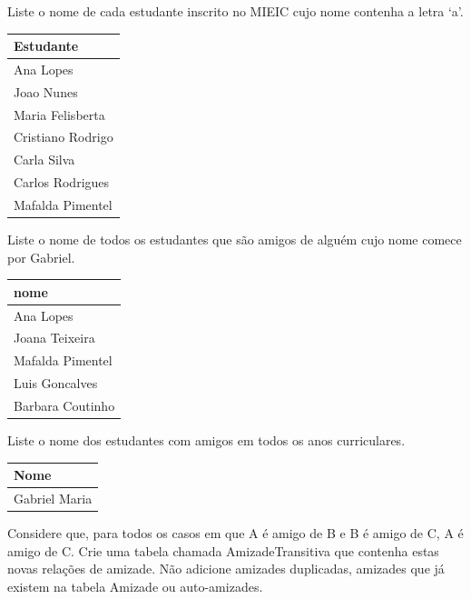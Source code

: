 \documentclass[type=recurso, year=2015/16]{bdad_exam}
\begin{document}
{
Liste o nome de cada estudante inscrito no MIEIC cujo nome contenha a letra `a'.
\begin{center} \begin{tabular}{l}
    \textbf{Estudante} \\ \hline
    Ana Lopes          \\
    Joao Nunes         \\
    Maria Felisberta   \\
    Cristiano Rodrigo  \\
    Carla Silva        \\
    Carlos Rodrigues   \\
    Mafalda Pimentel   
\end{tabular} \end{center}


Liste o nome de todos os estudantes que são amigos de alguém cujo nome comece por Gabriel.
\begin{center} \begin{tabular}{l}
    \textbf{nome}    \\ \hline
    Ana Lopes        \\
    Joana Teixeira   \\
    Mafalda Pimentel \\
    Luis Goncalves   \\
    Barbara Coutinho
\end{tabular} \end{center}


Liste o nome dos estudantes com amigos em todos os anos curriculares.
\begin{center} \begin{tabular}{l}
    \textbf{Nome}    \\ \hline
    Gabriel Maria
\end{tabular} \end{center}


\newpage
{}
Considere que, para todos os casos em que A é amigo de B e B é amigo de C, A é amigo de C. Crie uma tabela chamada AmizadeTransitiva que contenha estas novas relações de amizade. Não adicione amizades duplicadas, amizades que já existem na tabela Amizade ou auto-amizades.

}
\end{document}
